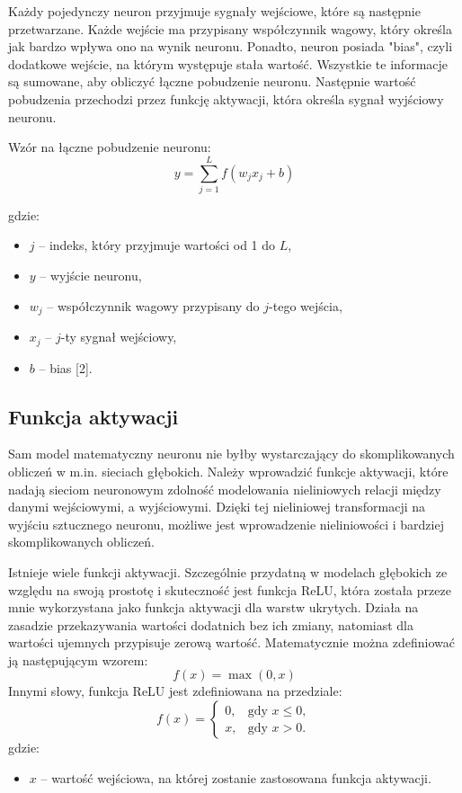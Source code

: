 \documentclass[a4paper]{article}
\begin{document}
Każdy pojedynczy neuron przyjmuje sygnały wejściowe, które są następnie przetwarzane.
Każde wejście ma przypisany współczynnik wagowy, który określa jak bardzo wpływa ono na wynik neuronu.
Ponadto, neuron posiada "bias", czyli dodatkowe wejście, na którym występuje stała wartość.
Wszystkie te informacje są sumowane, aby obliczyć łączne pobudzenie neuronu.
Następnie wartość pobudzenia przechodzi przez funkcję aktywacji, która określa sygnał wyjściowy neuronu.

Wzór na łączne pobudzenie neuronu:
\[
    y = \sum_{j=1}^{L} f(w_{j} x_{j} + b)
\]

gdzie:
\begin{itemize}
    \item $j$ -- indeks, który przyjmuje wartości od 1 do $L$,
    \item $y$ -- wyjście neuronu,
    \item $w_{j}$ -- współczynnik wagowy przypisany do $j$-tego wejścia,
    \item $x_{j}$ -- $j$-ty sygnał wejściowy,
    \item $b$ -- bias [2].
\end{itemize}

\subsection{Funkcja aktywacji}
Sam model matematyczny neuronu nie byłby wystarczający do skomplikowanych obliczeń w m.in. sieciach głębokich.
Należy wprowadzić funkcje aktywacji, które nadają sieciom neuronowym zdolność modelowania nieliniowych relacji między danymi wejściowymi, a wyjściowymi.
Dzięki tej nieliniowej transformacji na wyjściu sztucznego neuronu, możliwe jest wprowadzenie nieliniowości i bardziej skomplikowanych obliczeń.

Istnieje wiele funkcji aktywacji.
Szczególnie przydatną w modelach głębokich ze względu na swoją prostotę i skuteczność jest funkcja ReLU, która została przeze mnie wykorzystana jako funkcja aktywacji dla warstw ukrytych.
Działa na zasadzie przekazywania wartości dodatnich bez ich zmiany, natomiast dla wartości ujemnych przypisuje zerową wartość.
Matematycznie można zdefiniować ją następującym wzorem:
\[
    f(x) = \max(0, x)
\]
Innymi słowy, funkcja ReLU jest zdefiniowana na przedziale:
\[
    f(x) = \begin{cases}
        0, & \text{gdy } x \leq 0, \\
        x, & \text{gdy } x > 0.
    \end{cases}
\]
gdzie:
\begin{itemize}
    \item $x$ -- wartość wejściowa, na której zostanie zastosowana funkcja aktywacji.
\end{itemize}
\end{document}
